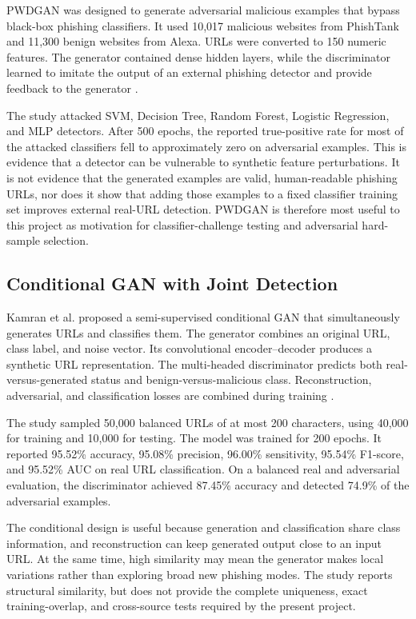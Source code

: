 PWDGAN was designed to generate adversarial malicious examples that bypass
black-box phishing classifiers. It used 10,017 malicious websites from
PhishTank and 11,300 benign websites from Alexa. URLs were converted to 150
numeric features. The generator contained dense hidden layers, while the
discriminator learned to imitate the output of an external phishing detector
and provide feedback to the generator \citep{bac2021pwdgan}.

The study attacked SVM, Decision Tree, Random Forest, Logistic Regression, and
MLP detectors. After 500 epochs, the reported true-positive rate for most of
the attacked classifiers fell to approximately zero on adversarial examples.
This is evidence that a detector can be vulnerable to synthetic feature
perturbations. It is not evidence that the generated examples are valid,
human-readable phishing URLs, nor does it show that adding those examples to a
fixed classifier training set improves external real-URL detection. PWDGAN is
therefore most useful to this project as motivation for classifier-challenge
testing and adversarial hard-sample selection.

\subsection{Conditional GAN with Joint Detection}

Kamran et al. proposed a semi-supervised conditional GAN that simultaneously
generates URLs and classifies them. The generator combines an original URL,
class label, and noise vector. Its convolutional encoder--decoder produces a
synthetic URL representation. The multi-headed discriminator predicts both
real-versus-generated status and benign-versus-malicious class. Reconstruction,
adversarial, and classification losses are combined during training
\citep{kamran2022conditional}.

The study sampled 50,000 balanced URLs of at most 200 characters, using 40,000
for training and 10,000 for testing. The model was trained for 200 epochs. It
reported 95.52\% accuracy, 95.08\% precision, 96.00\% sensitivity, 95.54\%
F1-score, and 95.52\% AUC on real URL classification. On a balanced real and
adversarial evaluation, the discriminator achieved 87.45\% accuracy and detected
74.9\% of the adversarial examples.

The conditional design is useful because generation and classification share
class information, and reconstruction can keep generated output close to an
input URL. At the same time, high similarity may mean the generator makes local
variations rather than exploring broad new phishing modes. The study reports
structural similarity, but does not provide the complete uniqueness, exact
training-overlap, and cross-source tests required by the present project.

